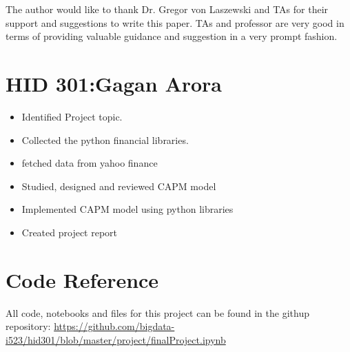 \begin{acks}

  The author would like to thank Dr. Gregor von Laszewski and TAs for their
  support and suggestions to write this paper. TAs and professor are very good in terms of providing valuable 
  guidance and suggestion in a very prompt fashion. 

\end{acks}


 


\newpage
\appendix
\section{HID 301:Gagan Arora}
\begin{itemize}
  \item Identified Project topic.
  \item Collected the python financial libraries.
  \item fetched data from yahoo finance
  \item Studied, designed and reviewed CAPM model
  \item Implemented CAPM model using python libraries 
  \item Created  project report  
\end{itemize}

\section{Code Reference}
All code, notebooks and files for this project can be found in the githup repository:
\url{https://github.com/bigdata-i523/hid301/blob/master/project/finalProject.ipynb}




